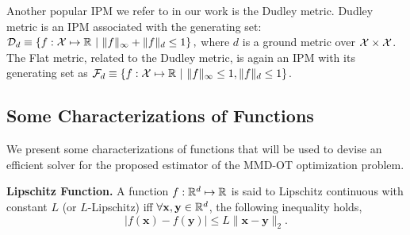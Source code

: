 
Another popular IPM we refer to in our work is the Dudley metric. Dudley metric is an IPM associated with the generating set: $\calD_d\equiv\left\{f:\calX\mapsto\R\ |\ \|f\|_\infty+\|f\|_d\le1\right\},$ where $d$ is a ground metric over $\mathcal{X} \times \mathcal{X}$.
The Flat metric, related to the Dudley metric, is again an IPM with its generating set as $\mathcal{F}_d\equiv\left\{f:\calX\mapsto\R\ |\ \|f\|_\infty\le1,\|f\|_d\le1\right\}$.

\subsection{Some Characterizations of Functions}
We present some characterizations of functions that will be used to devise an efficient solver for the proposed estimator of the MMD-OT optimization problem.
\begin{definitionBox}
\begin{definition}{\textbf{Lipschitz Function.}}\label{defn:f-L}\newline
A function $f: \mathbb{R}^d\mapsto \mathbb{R}$ is said to Lipschitz continuous with constant $L$ (or $L$-Lipschitz) iff $\forall \mathbf{x}, \mathbf{y} \in \mathbb{R}^d$, the following inequality holds,
$$|f(\mathbf{x})-f(\mathbf{y})|\leq L\|\mathbf{x}-\mathbf{y}\|_2.$$
\vspace{-0.4in}
\end{definition}
\end{definitionBox}

